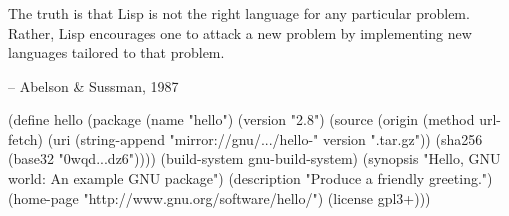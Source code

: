 \documentclass{beamer}
\begin{document}
\begin{frame}[plain]
  \frametitle{}
  
  \vspace{0.5cm}
  \textrm{\LARGE{%
      The truth is that Lisp is not the right language for
      any particular problem.  Rather, Lisp encourages one to attack a
      new problem by \alert{implementing new languages} tailored to that
      problem.  }}

  \vspace{1cm}
  \hfill{-- Abelson \& Sussman, 1987}
\end{frame}

\begin{frame}[fragile]
  \begin{semiverbatim}
(define hello
  (\alert{package}
   (name "hello")
   (version "2.8")
   (source (\alert{origin}
            (method url-fetch)
            (uri (string-append
                  "mirror://gnu/\textrm{...}/hello-" version
                  ".tar.gz"))
            (sha256 (base32 "0wqd\textrm{...}dz6"))))
   (\alert{build-system} gnu-build-system)
   (synopsis "Hello, GNU world: An example GNU package")
   (description "Produce a friendly greeting.")
   (home-page "http://www.gnu.org/software/hello/")
   (license gpl3+)))
  \end{semiverbatim}

\end{frame}
\end{document}
